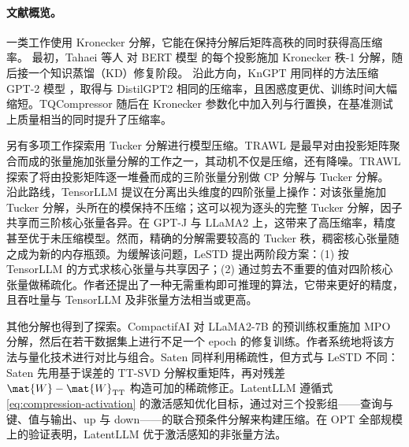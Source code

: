 \paragraph{文献概览。} 

一类工作使用 Kronecker 分解，它能在保持分解后矩阵高秩的同时获得高压缩率。
最初，Tahaei 等人 \cite{tahaei2021kroneckerbert} 对 BERT 模型 \cite{devlin2019bert} 的每个投影施加 Kronecker 秩-1 分解，随后接一个知识蒸馏（KD）修复阶段。
沿此方向，KnGPT \cite{edalati2021kroneckergpt} 用同样的方法压缩 GPT-2 模型 \cite{radford2019language}，取得与 DistilGPT2 \cite{sanh2019distilbert} 相同的压缩率，且困惑度更优、训练时间大幅缩短。TQCompressor \cite{abronin2024tqcompressor} 随后在 Kronecker 参数化中加入列与行置换，在基准测试上质量相当的同时提升了压缩率。

另有多项工作探索用 Tucker 分解进行模型压缩。TRAWL \cite{luo2025trawl} 是最早对由投影矩阵聚合而成的张量施加张量分解的工作之一，其动机不仅是压缩，还有降噪。TRAWL 探索了将由投影矩阵逐一堆叠而成的三阶张量分别做 CP 分解与 Tucker 分解。
沿此路线，TensorLLM \cite{gu2025tensorllm} 提议在分离出头维度的四阶张量上操作：对该张量施加 Tucker 分解，头所在的模保持不压缩；这可以视为逐头的完整 Tucker 分解，因子共享而三阶核心张量各异。在 GPT-J \cite{wang2021gpt_j} 与 LLaMA2 \cite{touvron2023llama2} 上，这带来了高压缩率，精度甚至优于未压缩模型。然而，精确的分解需要较高的 Tucker 秩，稠密核心张量随之成为新的内存瓶颈。为缓解该问题，LeSTD \cite{li2026lestd} 提出两阶段方案：(1) 按 TensorLLM 的方式求核心张量与共享因子；(2) 通过剪去不重要的值对四阶核心张量做稀疏化。作者还提出了一种无需重构即可推理的算法，它带来更好的精度，且吞吐量与 TensorLLM 及非张量方法相当或更高。

其他分解也得到了探索。CompactifAI \cite{compactifai} 对 LLaMA2-7B \cite{touvron2023llama2} 的预训练权重施加 MPO 分解，然后在若干数据集上进行不足一个 epoch 的修复训练。作者系统地将该方法与量化技术进行对比与组合。Saten \cite{solgi2025saten} 同样利用稀疏性，但方式与 LeSTD \cite{li2026lestd} 不同：Saten 先用基于误差的 TT-SVD \cite{oseledets2011tensor} 分解权重矩阵，再对残差 $\mat{W} - \mat{W}_{\rm TT}$ 构造可加的稀疏修正。LatentLLM \cite{koikeakino2025latentllm} 遵循式 \eqref{eq:compression-activation} 的激活感知优化目标，通过对三个投影组——查询与键、值与输出、up 与 down——的联合预条件分解来构建压缩。在 OPT \cite{zhang2022opt} 全部规模上的验证表明，LatentLLM 优于激活感知的非张量方法。


